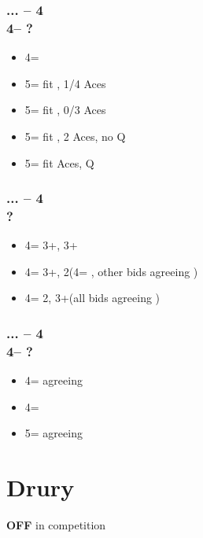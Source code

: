 \subsubsection*{... -- 4\clubs\\
                4\spades -- ?}
\begin{itemize}
    \item 4\nt = \soff
    \item 5\clubs = fit \diams, 1/4 Aces
    \item 5\diams = fit \diams, 0/3 Aces
    \item 5\hearts = fit \diams, 2 Aces, no Q\diams
    \item 5\spades = fit  Aces, Q\diams
\end{itemize}

\subsubsection*{... -- 4\diams\\
                ?}
\begin{itemize}
    \item 4\hearts = 3+\clubs, 3+\diams
    \item 4\spades = 3+\clubs, 2\diams (4\nt = \soff, other bids agreeing \clubs)
    \item 4\nt = 2\clubs, 3+\diams (all bids agreeing \diams)
\end{itemize}

\subsubsection*{... -- 4\diams\\
                4\hearts -- ?}
\begin{itemize}
    \item 4\spades = agreeing \clubs
    \item 4\nt = \soff
    \item 5\clubs = agreeing \diams
\end{itemize}

\section{\texorpdfstring{Drury}{drury}}\label{sec:drury}

{\textbf{OFF}} in competition

